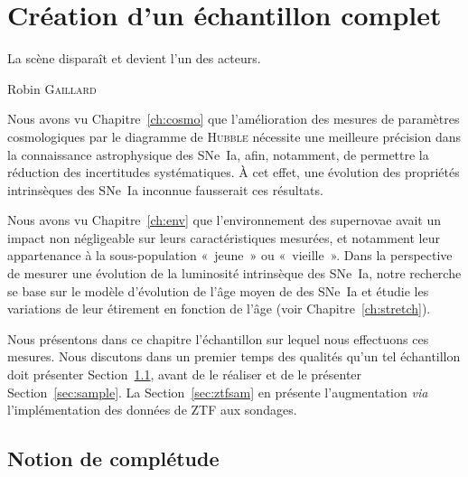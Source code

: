 \documentclass[../main/main.tex]{subfiles}
\begin{document}

\chapter{Cr\'eation d'un \'echantillon complet}\label{ch:sample}
\epigraph{\openquote La scène disparaît et devient l'un des
acteurs.\closequote}{Robin \textsc{Gaillard}}

Nous avons vu Chapitre~\ref{ch:cosmo} que l'amélioration des mesures de
paramètres cosmologiques par le diagramme de \textsc{Hubble} nécessite une
meilleure précision dans la connaissance astrophysique des SNe~Ia, afin,
notamment, de permettre la réduction des incertitudes systématiques. À cet
effet, une évolution des propriétés intrinsèques des SNe~Ia inconnue fausserait
ces résultats.

Nous avons vu Chapitre~\ref{ch:env} que l'environnement des supernovae avait un
impact non négligeable sur leurs caractéristiques mesurées, et notamment leur
appartenance à la sous-population «~jeune~» ou «~vieille~». Dans la perspective
de mesurer une évolution de la luminosité intrinsèque des SNe~Ia, notre
recherche se base sur le modèle d'évolution de l'âge moyen de \cite{rigault2020}
des SNe~Ia et étudie les variations de leur étirement en fonction de l'âge (voir
Chapitre~\ref{ch:stretch}).

Nous présentons dans ce chapitre l'échantillon sur lequel nous effectuons ces
mesures. Nous discutons dans un premier temps des qualités qu'un tel échantillon
doit présenter Section~\ref{sec:compl}, avant de le réaliser et de le présenter
Section~\ref{sec:sample}. La Section~\ref{sec:ztfsam} en présente l'augmentation
\textit{via} l'implémentation des données de ZTF aux sondages.

\vfill
\minitoc
\vfill
\newpage

\section{Notion de complétude}\label{sec:compl}

\end{document}
